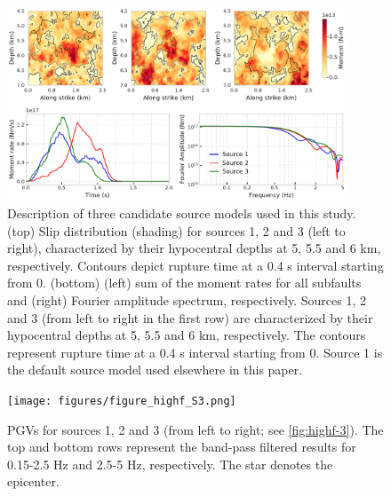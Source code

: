 \begin{figure}[!ht]
  \includegraphics[width=0.9\textwidth,height=0.9\textheight,keepaspectratio]{figures/figure_highf_S2.pdf}
  \caption{Description of three candidate source models used in this study. (top) Slip distribution (shading) for sources 1, 2 and 3 (left to right), characterized by their hypocentral depths at 5, 5.5 and 6 km, respectively. Contours depict rupture time at a 0.4 s interval starting from 0. (bottom) (left) sum of the moment rates for all subfaults and (right) Fourier amplitude spectrum, respectively.  Sources 1, 2 and 3 (from left to right in the first row) are characterized by their hypocentral depths at 5, 5.5 and 6 km, respectively. The contours represent rupture time at a 0.4 s interval starting from 0. Source 1 is the default source model used elsewhere in this paper.}
  \label{fig:highf-S2}
\end{figure}
\clearpage

\begin{figure}[!ht]
  \texttt{[image: figures/figure\_highf\_S3.png]}
  \caption{PGVs for sources 1, 2 and 3 (from left to right; see \cref{fig:highf-3}). The top and bottom rows represent the band-pass filtered results for 0.15-2.5 Hz and 2.5-5 Hz, respectively. The star denotes the epicenter.}
  \label{fig:highf-S3}
\end{figure}
\clearpage


